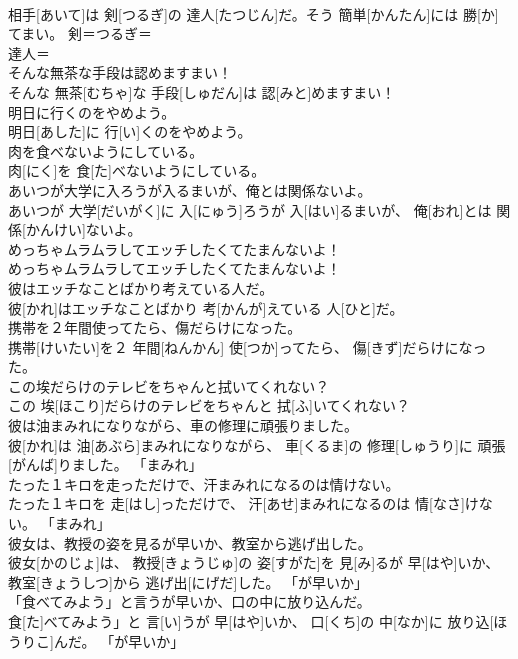 \documentclass[8pt]{extreport}
\begin{document}
\begin{CJK}{UTF8}{min}
\\	相手[あいて]は 剣[つるぎ]の 達人[たつじん]だ。そう 簡単[かんたん]には 勝[か]てまい。	剣＝つるぎ＝ 
\\	達人＝ 
\\	そんな無茶な手段は認めますまい！	
\\	そんな 無茶[むちゃ]な 手段[しゅだん]は 認[みと]めますまい！	
\\	明日に行くのをやめよう。	
\\	明日[あした]に 行[い]くのをやめよう。	
\\	肉を食べないようにしている。	
\\	肉[にく]を 食[た]べないようにしている。	
\\	あいつが大学に入ろうが入るまいが、俺とは関係ないよ。	
\\	あいつが 大学[だいがく]に 入[にゅう]ろうが 入[はい]るまいが、 俺[おれ]とは 関係[かんけい]ないよ。	
\\	めっちゃムラムラしてエッチしたくてたまんないよ！	
\\	めっちゃムラムラしてエッチしたくてたまんないよ！	
\\	彼はエッチなことばかり考えている人だ。	
\\	彼[かれ]はエッチなことばかり 考[かんが]えている 人[ひと]だ。	
\\	携帯を２年間使ってたら、傷だらけになった。	
\\	携帯[けいたい]を２ 年間[ねんかん] 使[つか]ってたら、 傷[きず]だらけになった。	
\\	この埃だらけのテレビをちゃんと拭いてくれない？	
\\	この 埃[ほこり]だらけのテレビをちゃんと 拭[ふ]いてくれない？	
\\	彼は油まみれになりながら、車の修理に頑張りました。	
\\	彼[かれ]は 油[あぶら]まみれになりながら、 車[くるま]の 修理[しゅうり]に 頑張[がんば]りました。	「まみれ」
\\	たった１キロを走っただけで、汗まみれになるのは情けない。	
\\	たった１キロを 走[はし]っただけで、 汗[あせ]まみれになるのは 情[なさ]けない。	「まみれ」
\\	彼女は、教授の姿を見るが早いか、教室から逃げ出した。	
\\	彼女[かのじょ]は、 教授[きょうじゅ]の 姿[すがた]を 見[み]るが 早[はや]いか、 教室[きょうしつ]から 逃げ出[にげだ]した。	「が早いか」
\\	「食べてみよう」と言うが早いか、口の中に放り込んだ。	
\\	食[た]べてみよう」と 言[い]うが 早[はや]いか、 口[くち]の 中[なか]に 放り込[ほうりこ]んだ。	「が早いか」

\end{CJK}
\end{document}
